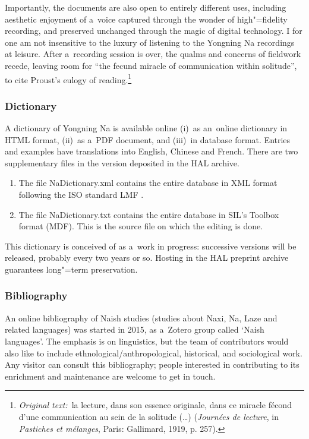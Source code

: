 Importantly, the documents are also open to entirely different uses, including aesthetic enjoyment of a~voice captured through the wonder of high"=fidelity recording, and preserved unchanged through the magic of digital technology. I for one am not insensitive to the luxury of listening to the Yongning Na recordings at leisure. After a~recording session is over, the qualms and concerns of fieldwork recede, leaving room for ``the fecund miracle of communication within solitude'', to cite Proust's eulogy of reading.\footnote{\textit{Original text:}~la lecture, dans son essence originale, dans ce miracle fécond d'une communication au sein de la solitude (\dots) (\textit{Journées de lecture}, in \textit{Pastiches et mélanges}, Paris: Gallimard, 1919, p. 257).}


\subsubsection{Dictionary}
\label{sec:dictionary}

A dictionary of Yongning Na \citep{michauddict2015} is available online (i)~as an~online dictionary in HTML format, (ii)~as a~PDF document, and (iii)~in database format. Entries and
examples have translations into {English}, Chinese and {French}. There are two supplementary files in
the version deposited in the HAL archive.
\begin{enumerate}[label=(\roman*)]
\item The file NaDictionary.xml contains the entire database in XML format following the ISO
  standard LMF \citep{francopoulo2013}.
\item The file NaDictionary.txt contains the entire database in SIL's Toolbox format (MDF).
  This is the source file on which the editing is done.
\end{enumerate}
This dictionary is conceived of as a~work in progress: successive versions will be released, probably
every two years or so. Hosting in the HAL preprint archive guarantees long"=term preservation.


\subsubsection{Bibliography}
\label{sec:bibliography}

An online bibliography of {Naish} studies (studies about {Naxi}, Na, {Laze} and related languages) was
started in 2015, as a~Zotero group \citep{duong2010zotero} called ‘{Naish} languages’. 
The
emphasis is on linguistics, but the team of contributors would also like to include
ethnological/{\allowbreak}anthropological, historical, and sociological work. Any visitor can
consult this bibliography; people interested in contributing to its enrichment and maintenance are
welcome to get in touch.


